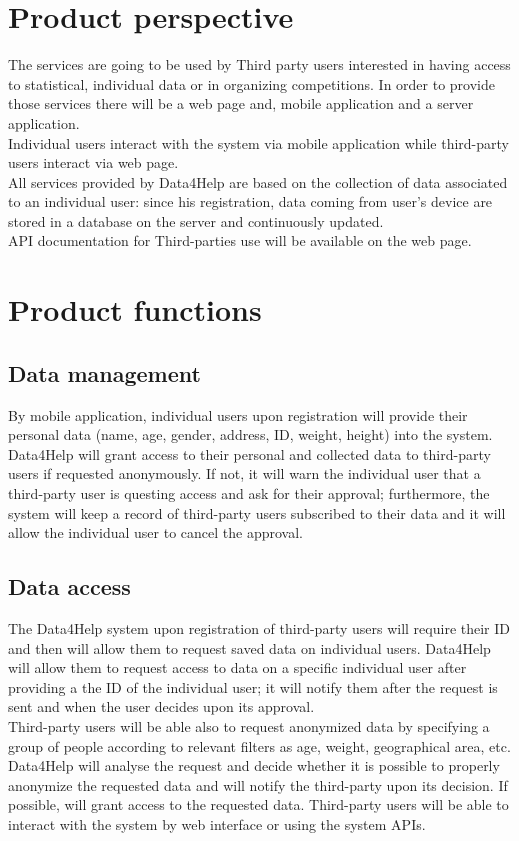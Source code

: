 \section{Product perspective}
The services are going to be used by Third party users interested in having access to statistical, individual data or in organizing competitions. In order to provide those services there will be a web page and, mobile application and a server application.  \\
Individual users interact with the system via mobile application while third-party users interact via web page. \\
All services provided by Data4Help are based on the collection of data associated to an individual user: since his registration, data coming from user’s device are stored in a database on the server and continuously updated. \\
API documentation for Third-parties use will be available on the web page. \\

\section{Product functions}
\subsection{Data management}
By mobile application, individual users upon registration will provide their personal data (name, age, gender, address, ID, weight, height) into the system. Data4Help will grant access to their personal and collected data to third-party users if requested anonymously. If not, it will warn the individual user that a third-party user is questing access and ask for their approval; furthermore, the system will keep a record of third-party users subscribed to their data and it will allow the individual user to cancel the approval.
\subsection{Data access}
The Data4Help system upon registration of third-party users will require their ID and then will allow them to request saved data on individual users. Data4Help will allow them to request access to data on a specific individual user after providing a the ID of the individual user; it will notify them after the request is sent and when the user decides upon its approval. \\
Third-party users will be able also to request anonymized data by specifying a group of people according to relevant filters as age, weight, geographical area, etc. 
Data4Help will analyse the request and decide whether it is possible to properly anonymize the requested data and will notify the third-party upon its decision. If possible, will grant access to the requested data. Third-party users will be able to interact with the system by web interface or using the system APIs.
